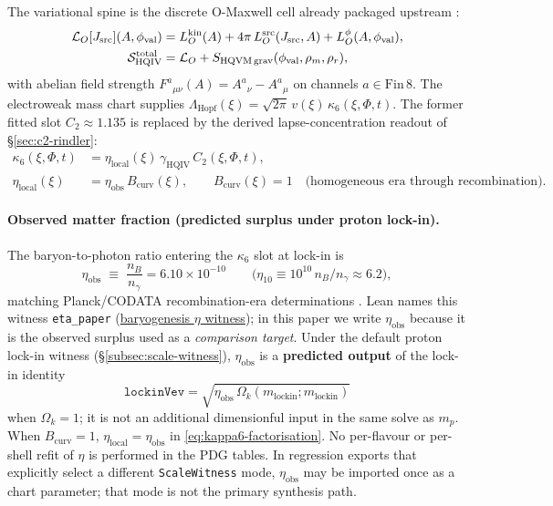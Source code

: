 \documentclass[11pt]{amsart}
\begin{document}
The variational spine is the discrete O-Maxwell cell already packaged upstream \cite{hqiv-oct-action-paper}:
\begin{equation}
\label{eq:O-Maxwell-cell}
\begin{aligned}
\mathcal{L}_O[J_{\rm src}](A,\phi_{\rm val})
&= L_O^{\rm kin}(A) + 4\pi\,L_O^{\rm src}(J_{\rm src},A) + L_O^\phi(A,\phi_{\rm val}), \\
\mathcal{S}_{\mathrm{HQIV}}^{\mathrm{total}}
&= \mathcal{L}_O + S_{\rm HQVM\,grav}(\phi_{\rm val},\rho_m,\rho_r),
\end{aligned}
\end{equation}
with abelian field strength $F^a{}_{\mu\nu}(A)=A^a{}_\nu-A^a{}_\mu$ on channels $a\in\mathrm{Fin}\,8$. The electroweak mass chart supplies
$\Lambda_{\mathrm{Hopf}}(\xi)=\sqrt{2\pi}\,v(\xi)\,\kappa_6(\xi,\Phi,t)$.
The former fitted slot $C_2\approx 1.135$ is replaced by the derived lapse-concentration readout of \S\ref{sec:c2-rindler}:
\begin{equation}
\label{eq:kappa6-factorisation}
\begin{aligned}
\kappa_6(\xi,\Phi,t)
&= \eta_{\mathrm{local}}(\xi)\,\gamma_{\mathrm{HQIV}}\,C_2(\xi,\Phi,t), \\
\eta_{\mathrm{local}}(\xi)
&= \eta_{\mathrm{obs}}\,B_{\mathrm{curv}}(\xi),
\qquad B_{\mathrm{curv}}(\xi)=1
\quad\text{(homogeneous era through recombination).}
\end{aligned}
\end{equation}

\paragraph{Observed matter fraction (predicted surplus under proton lock-in).}
The baryon-to-photon ratio entering the $\kappa_6$ slot at lock-in is
\begin{equation}
\label{eq:eta-obs}
\eta_{\mathrm{obs}}
\;\equiv\;
\frac{n_B}{n_\gamma}
= 6.10\times 10^{-10}
\qquad\bigl(\eta_{10}\equiv 10^{10}\,n_B/n_\gamma \approx 6.2\bigr),
\end{equation}
matching Planck/CODATA recombination-era determinations \cite{planck2018cosmo,codata2018,coc2015}. Lean names this witness \texttt{eta\_paper} (\hyperref[lean:baryogenesis-eta]{baryogenesis $\eta$ witness}); in this paper we write $\eta_{\mathrm{obs}}$ because it is the observed surplus used as a \emph{comparison target}. Under the default proton lock-in witness (\S\ref{subsec:scale-witness}), $\eta_{\mathrm{obs}}$ is a \textbf{predicted output} of the lock-in identity
\[
\texttt{lockinVev}=\sqrt{\eta_{\mathrm{obs}}\,\Omega_k(m_{\mathrm{lockin}};m_{\mathrm{lockin}})}
\]
when $\Omega_k=1$; it is not an additional dimensionful input in the same solve as $m_p$. When $B_{\mathrm{curv}}=1$, $\eta_{\mathrm{local}}=\eta_{\mathrm{obs}}$ in \eqref{eq:kappa6-factorisation}. No per-flavour or per-shell refit of $\eta$ is performed in the PDG tables. In regression exports that explicitly select a different \texttt{ScaleWitness} mode, $\eta_{\mathrm{obs}}$ may be imported once as a chart parameter; that mode is not the primary synthesis path.
\end{document}
